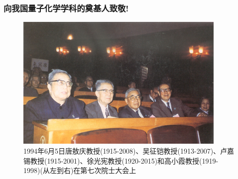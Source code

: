 \documentclass[cjk,slidestop,handout,compress,mathserif,blue]{beamer}	%
\begin{document}
\frame
{
	\frametitle{向我国量子化学学科的奠基人致敬!}
\begin{figure}[h!]
	\centering
\centering
\vspace{-10.5pt}
\includegraphics[height=0.52\textwidth,width=0.9\textwidth,viewport=0 0 435 250,clip]{Figures/1994_6_5.jpg}
\caption{1994年6月5日唐敖庆教授(1915-2008)、吴征铠教授(1913-2007)、卢嘉锡教授(1915-2001)、徐光宪教授(1920-2015)和高小霞教授(1919-1998)(从左到右)在第七次院士大会上}
\label{Tang_Wu_Lu_Xu}
\end{figure}
}


\end{document}
